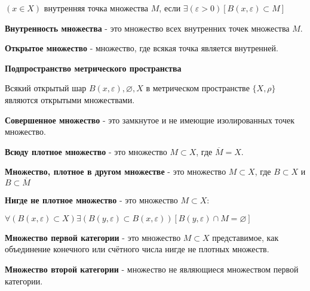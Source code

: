 $(x \in X)$ внутренняя точка множества $M$, если $\exists(\varepsilon>0)[B(x,\varepsilon)\subset M]$

\textbf{Внутренность множества} - это множество всех внутренних точек множества $M$.

\textbf{Открытое множество} - множество, где всякая точка является внутренней.

\textbf{Подпространство метрического пространства}

Всякий открытый шар $B(x, \varepsilon), \varnothing, X $ в метрическом пространстве $\{X, \rho \}$ являются открытыми множествами. 

\textbf{Совершенное множество} - это замкнутое и не имеющие изолированных точек множество.

\textbf{Всюду плотное множество} - это множество  $ M \subset X$, где $ \overline{M}=X$.

\textbf{Множество, плотное в другом множестве} - это множество $ M \subset X$, где $ B \subset X$ и $B \subset \overline{M}$

\textbf{Нигде не плотное множество}  - это множество $ M \subset X$:

$\forall(B(x, \varepsilon) \subset X) \exists(B(y, \varepsilon) \subset B(x, \varepsilon))[B(y, \varepsilon)\cap M=\varnothing]$

\textbf{Множество первой категории} - это множество $M \subset X$ представимое, как объединение конечного или счётного числа нигде не плотных множеств.

\textbf{Множество второй категории} - множество не являющиеся множеством первой категории.
